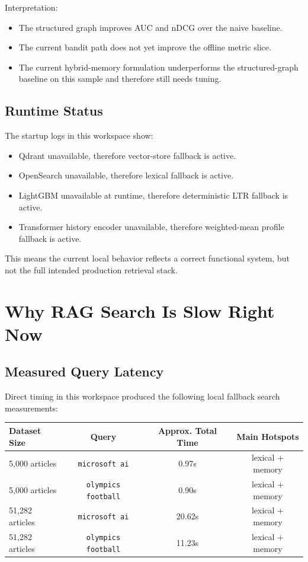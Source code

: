 \documentclass[12pt]{article}
\begin{document}
Interpretation:
\begin{itemize}[leftmargin=1.5em]
  \item The structured graph improves AUC and nDCG over the naive baseline.
  \item The current bandit path does not yet improve the offline metric slice.
  \item The current hybrid-memory formulation underperforms the structured-graph baseline on this sample and therefore still needs tuning.
\end{itemize}

\subsection{Runtime Status}
The startup logs in this workspace show:
\begin{itemize}[leftmargin=1.5em]
  \item Qdrant unavailable, therefore vector-store fallback is active.
  \item OpenSearch unavailable, therefore lexical fallback is active.
  \item LightGBM unavailable at runtime, therefore deterministic LTR fallback is active.
  \item Transformer history encoder unavailable, therefore weighted-mean profile fallback is active.
\end{itemize}

This means the current local behavior reflects a correct functional system, but not the full intended production retrieval stack.

\section{Why RAG Search Is Slow Right Now}
\subsection{Measured Query Latency}
Direct timing in this workspace produced the following local fallback search measurements:

\begin{center}
\begin{tabular}{lccc}
\toprule
Dataset Size & Query & Approx. Total Time & Main Hotspots \\
\midrule
5,000 articles & \texttt{microsoft ai} & 0.97s & lexical + memory \\
5,000 articles & \texttt{olympics football} & 0.90s & lexical + memory \\
51,282 articles & \texttt{microsoft ai} & 20.62s & lexical + memory \\
51,282 articles & \texttt{olympics football} & 11.23s & lexical + memory \\
\bottomrule
\end{tabular}
\end{center}
\end{document}
